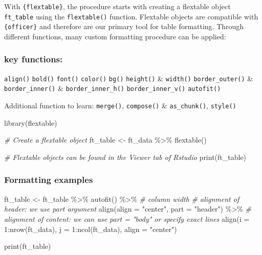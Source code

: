 \documentclass[
]{book}
\newenvironment{Shaded}{\begin{snugshade}}{\end{snugshade}}
\newcommand{\AttributeTok}[1]{\textcolor[rgb]{0.77,0.63,0.00}{#1}}
\newcommand{\CommentTok}[1]{\textcolor[rgb]{0.56,0.35,0.01}{\textit{#1}}}
\newcommand{\DecValTok}[1]{\textcolor[rgb]{0.00,0.00,0.81}{#1}}
\newcommand{\FunctionTok}[1]{\textcolor[rgb]{0.00,0.00,0.00}{#1}}
\newcommand{\NormalTok}[1]{#1}
\newcommand{\OtherTok}[1]{\textcolor[rgb]{0.56,0.35,0.01}{#1}}
\newcommand{\SpecialCharTok}[1]{\textcolor[rgb]{0.00,0.00,0.00}{#1}}
\newcommand{\StringTok}[1]{\textcolor[rgb]{0.31,0.60,0.02}{#1}}
\begin{document}
With \texttt{\{flextable\}}, the procedure starts with creating a flextable object \texttt{ft\_table} using the \texttt{flextable()} function.
Flextable objects are compatible with \texttt{\{officer\}} and therefore are our primary tool for table formatting.
Through different functions, many custom formatting procedure can be applied:

\hypertarget{key-functions-2}{%
\subsubsection{key functions:}\label{key-functions-2}}

\texttt{align()} \texttt{bold()} \texttt{font()} \texttt{color()} \texttt{bg()} \texttt{height()} \& \texttt{width()}
\texttt{border\_outer()} \& \texttt{border\_inner()} \& \texttt{border\_inner\_h()} \texttt{border\_inner\_v()} \texttt{autofit()}

Additional function to learn: \texttt{merge()}, \texttt{compose()} \& \texttt{as\_chunk()}, \texttt{style()}

\begin{Shaded}
\begin{Highlighting}[]
\FunctionTok{library}\NormalTok{(flextable)}

\CommentTok{\# Create a flextable object}
\NormalTok{ft\_table }\OtherTok{\textless{}{-}}\NormalTok{ ft\_data }\SpecialCharTok{\%\textgreater{}\%} 
  \FunctionTok{flextable}\NormalTok{()}

\CommentTok{\# Flextable objects can be found in the Viewer tab of Rstudio}
\FunctionTok{print}\NormalTok{(ft\_table)}
\end{Highlighting}
\end{Shaded}

\hypertarget{formatting-examples}{%
\subsubsection{Formatting examples}\label{formatting-examples}}

\begin{Shaded}
\begin{Highlighting}[]
\NormalTok{ft\_table }\OtherTok{\textless{}{-}}\NormalTok{ ft\_table }\SpecialCharTok{\%\textgreater{}\%}
  \FunctionTok{autofit}\NormalTok{() }\SpecialCharTok{\%\textgreater{}\%} \CommentTok{\# column width}
  \CommentTok{\# alignment of header: we use part argument}
  \FunctionTok{align}\NormalTok{(}\AttributeTok{align =} \StringTok{"center"}\NormalTok{, }\AttributeTok{part =} \StringTok{"header"}\NormalTok{) }\SpecialCharTok{\%\textgreater{}\%}
  \CommentTok{\# alignment of content: we can use part = "body" or specify exact lines }
  \FunctionTok{align}\NormalTok{(}\AttributeTok{i =} \DecValTok{1}\SpecialCharTok{:}\FunctionTok{nrow}\NormalTok{(ft\_data), }\AttributeTok{j =} \DecValTok{1}\SpecialCharTok{:}\FunctionTok{ncol}\NormalTok{(ft\_data), }\AttributeTok{align =} \StringTok{"center"}\NormalTok{) }

\FunctionTok{print}\NormalTok{(ft\_table)}
\end{Highlighting}
\end{Shaded}
\end{document}
